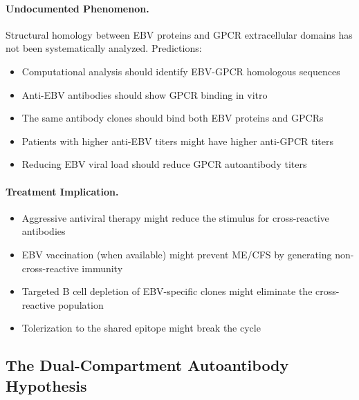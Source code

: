 \paragraph{Undocumented Phenomenon.} Structural homology between EBV proteins and GPCR extracellular domains has not been systematically analyzed. Predictions:
\begin{itemize}
    \item Computational analysis should identify EBV-GPCR homologous sequences
    \item Anti-EBV antibodies should show GPCR binding in vitro
    \item The same antibody clones should bind both EBV proteins and GPCRs
    \item Patients with higher anti-EBV titers might have higher anti-GPCR titers
    \item Reducing EBV viral load should reduce GPCR autoantibody titers
\end{itemize}

\paragraph{Treatment Implication.}
\begin{itemize}
    \item Aggressive antiviral therapy might reduce the stimulus for cross-reactive antibodies
    \item EBV vaccination (when available) might prevent ME/CFS by generating non-cross-reactive immunity
    \item Targeted B cell depletion of EBV-specific clones might eliminate the cross-reactive population
    \item Tolerization to the shared epitope might break the cycle
\end{itemize}

\subsection{The Dual-Compartment Autoantibody Hypothesis}

